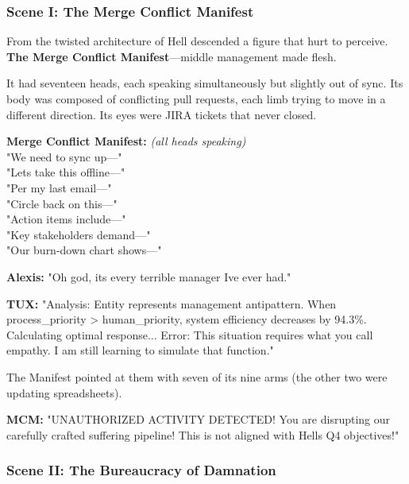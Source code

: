 \bookdivider

\subsubsection{Scene I: The Merge Conflict Manifest}\label{scene-i-the-merge-conflict-manifest}

From the twisted architecture of Hell descended a figure that hurt to perceive. \textbf{The Merge Conflict Manifest}---middle management made flesh.

It had seventeen heads, each speaking simultaneously but slightly out of sync. Its body was composed of conflicting pull requests, each limb trying to move in a different direction. Its eyes were JIRA tickets that never closed.

\textbf{Merge Conflict Manifest:} \emph{(all heads speaking)}\\
"We need to sync up---"\\
"Let\textquotesingle s take this offline---"\\
"Per my last email---"\\
"Circle back on this---"\\
"Action items include---"\\
"Key stakeholders demand---"\\
"Our burn-down chart shows---"

\textbf{Alexis:} "Oh god, it\textquotesingle s every terrible manager I\textquotesingle ve ever had."

\textbf{TUX:} "Analysis: Entity represents management antipattern. When process\_priority \textgreater{} human\_priority, system efficiency decreases by 94.3\%. Calculating optimal response... Error: This situation requires what you call \textquotesingle empathy.\textquotesingle{} I am still learning to simulate that function."

The Manifest pointed at them with seven of its nine arms (the other two were updating spreadsheets).

\textbf{MCM:} "UNAUTHORIZED ACTIVITY DETECTED! You are disrupting our carefully crafted suffering pipeline! This is not aligned with Hell\textquotesingle s Q4 objectives!"

\bookdivider

\subsubsection{Scene II: The Bureaucracy of Damnation}\label{scene-ii-the-bureaucracy-of-damnation}

